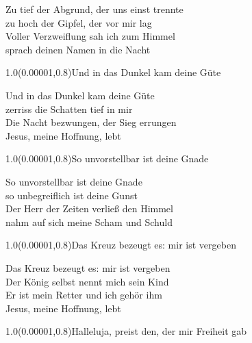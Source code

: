 \documentclass[aspectratio=169]{beamer}
\begin{document}
\color{white}
\begin{frame}
\centering
\color{white}
\huge{Zu tief der Abgrund, der uns einst trennte} \\
\huge{zu hoch der Gipfel, der vor mir lag} \\
\huge{Voller Verzweiflung sah ich zum Himmel} \\
\huge{sprach deinen Namen in die Nacht} \\

\begin{textblock}{1.0}(0.00001,0.8)\color{gray}\normalsize{Und in das Dunkel kam deine Güte}\end{textblock}
\end{frame}

\begin{frame}
\centering
\color{white}
\huge{Und in das Dunkel kam deine Güte} \\
\huge{zerriss die Schatten tief in mir} \\
\huge{Die Nacht bezwungen, der Sieg errungen} \\
\huge{Jesus, meine Hoffnung, lebt} \\

\begin{textblock}{1.0}(0.00001,0.8)\color{gray}\normalsize{So unvorstellbar ist deine Gnade}\end{textblock}
\end{frame}

\begin{frame}
\centering
\color{white}
\huge{So unvorstellbar ist deine Gnade} \\
\huge{so unbegreiflich ist deine Gunst} \\
\huge{Der Herr der Zeiten verließ den Himmel} \\
\huge{nahm auf sich meine Scham und Schuld} \\

\begin{textblock}{1.0}(0.00001,0.8)\color{gray}\normalsize{Das Kreuz bezeugt es: mir ist vergeben}\end{textblock}
\end{frame}

\begin{frame}
\centering
\color{white}
\huge{Das Kreuz bezeugt es: mir ist vergeben} \\
\huge{Der König selbst nennt mich sein Kind} \\
\huge{Er ist mein Retter und ich gehör ihm} \\
\huge{Jesus, meine Hoffnung, lebt} \\

\begin{textblock}{1.0}(0.00001,0.8)\color{gray}\normalsize{Halleluja, preist den, der mir Freiheit gab}\end{textblock}
\end{frame}
\end{document}
